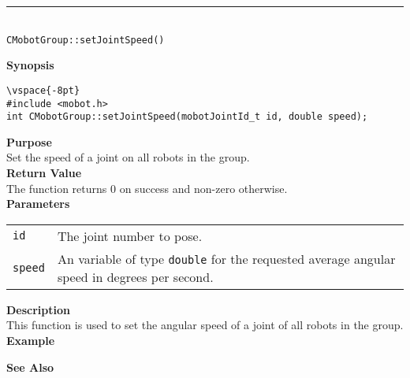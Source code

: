 \noindent
\vspace{5pt}
\rule{4.5in}{0.015in}\\
\noindent
{\LARGE \texttt{CMobotGroup::setJointSpeed()}}\\
{}

\noindent
{\bf Synopsis}
\begin{verbatim}
\vspace{-8pt}
#include <mobot.h>
int CMobotGroup::setJointSpeed(mobotJointId_t id, double speed);
\end{verbatim}

\noindent
{\bf Purpose}\\
Set the speed of a joint on all robots in the group.\\

\noindent
{\bf Return Value}\\
The function returns 0 on success and non-zero otherwise.\\

\noindent
{\bf Parameters}
\vspace{-0.1in}
\begin{description}
\item               
\begin{tabular}{p{10 mm}p{145 mm}}
\texttt{id} & The joint number to pose. \\
\texttt{speed} & An variable of type \texttt{double} for the requested average
angular speed in degrees per second.
\end{tabular}
\end{description}

\noindent
{\bf Description}\\
This function is used to set the angular speed of a joint of all robots in the group. 
\noindent\\
{\bf Example}\\
\noindent

\noindent
{\bf See Also}\\

